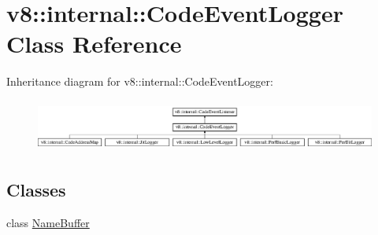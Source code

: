 \hypertarget{classv8_1_1internal_1_1_code_event_logger}{}\section{v8\+:\+:internal\+:\+:Code\+Event\+Logger Class Reference}
\label{classv8_1_1internal_1_1_code_event_logger}
Inheritance diagram for v8\+:\+:internal\+:\+:Code\+Event\+Logger\+:\begin{figure}[H]
\begin{center}
\leavevmode
\includegraphics[height=1.723077cm]{classv8_1_1internal_1_1_code_event_logger}
\end{center}
\end{figure}
\subsection*{Classes}
\begin{DoxyCompactItemize}
\item 
class \hyperlink{classv8_1_1internal_1_1_code_event_logger_1_1_name_buffer}{Name\+Buffer}
\end{DoxyCompactItemize}
